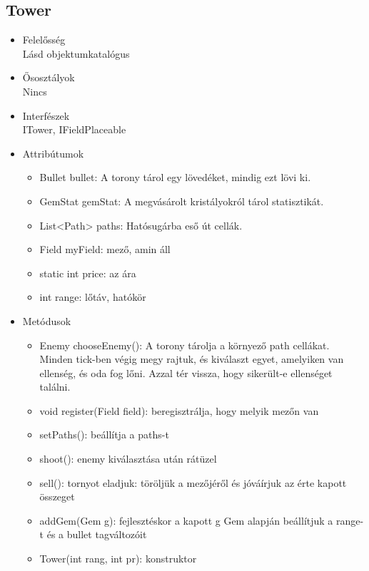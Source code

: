 \subsection{Tower}
\begin{itemize}
\item Felelősség\\
Lásd objektumkatalógus
\item Ősosztályok\\
Nincs
\item Interfészek\\
ITower, IFieldPlaceable
\item Attribútumok\\
	\begin{itemize}
		\item Bullet bullet: A torony tárol egy lövedéket, mindig ezt lövi ki.
		\item GemStat gemStat: A megvásárolt kristályokról tárol  statisztikát.
		\item List<Path> paths: Hatósugárba eső út cellák.
		\item Field myField: mező, amin áll
		\item static int price: az ára
		\item int range: lőtáv, hatókör

		
	\end{itemize}
\item Metódusok\\
	\begin{itemize}
		\item Enemy chooseEnemy(): A torony tárolja a környező path cellákat. Minden tick-ben végig megy rajtuk, és kiválaszt egyet, amelyiken van ellenség, és oda fog lőni. Azzal tér vissza, hogy sikerült-e ellenséget találni.
		\item void register(Field field): beregisztrálja, hogy melyik mezőn van
		\item setPaths(): beállítja a paths-t
		\item shoot(): enemy kiválasztása után rátüzel
		\item sell(): tornyot eladjuk: töröljük a mezőjéről és jóváírjuk az érte kapott összeget
		\item addGem(Gem g): fejlesztéskor a kapott g Gem alapján beállítjuk a range-t és a bullet tagváltozóit
		\item Tower(int rang, int pr): konstruktor
		
		
	\end{itemize}
\end{itemize}
